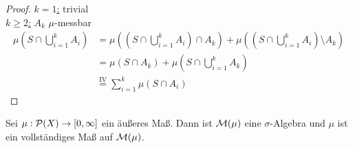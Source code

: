 \documentclass[11pt,a4paper,fleqn,openany]{report}
\begin{document}
    \begin{proof}
      \underline{$k=1$:} trivial\\
      \underline{$k \geq 2$:} $A_k$ $\mu$-messbar\\
      \begin{align*}
        \mu(S \cap \bigcup\limits_{i=1}^k A_i) 
        &= \mu((S \cap \bigcup\limits_{i=1}^k A_i) \cap A_k) + \mu((S \cap \bigcup\limits_{i=1}^k A_i) \setminus A_k)\\
        &=\mu(S \cap A_k) + \mu(S \cap \bigcup\limits_{i=1}^k A_k)\\
        &\stackrel{\text{IV}}{=} \sum\limits_{i=1}^k \mu(S \cap A_i) 
      \end{align*}
    \end{proof}

    \begin{theorem}
      Sei $\mu: \mathcal{P}(X) \to [0,\infty]$ ein äußeres Maß. Dann ist $\mathcal{M}(\mu)$ eine $\sigma$-Algebra und $\mu$ ist ein vollständiges Maß auf $\mathcal{M}(\mu)$.
    \end{theorem}
\end{document}
